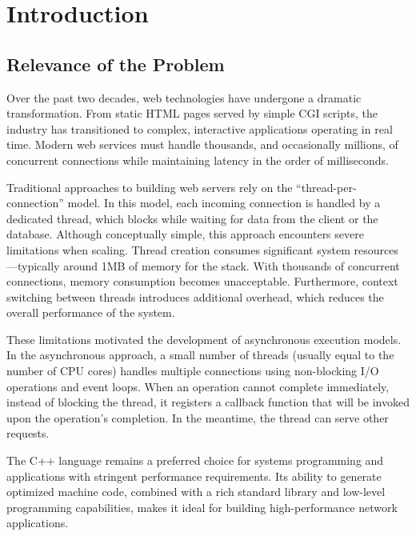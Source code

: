\section{Introduction}

\subsection{Relevance of the Problem}

Over the past two decades, web technologies have undergone a dramatic transformation. From static HTML pages served by simple CGI scripts, the industry has transitioned to complex, interactive applications operating in real time. Modern web services must handle thousands, and occasionally millions, of concurrent connections while maintaining latency in the order of milliseconds.

Traditional approaches to building web servers rely on the ``thread-per-connection'' model. In this model, each incoming connection is handled by a dedicated thread, which blocks while waiting for data from the client or the database. Although conceptually simple, this approach encounters severe limitations when scaling. Thread creation consumes significant system resources---typically around 1MB of memory for the stack. With thousands of concurrent connections, memory consumption becomes unacceptable. Furthermore, context switching between threads introduces additional overhead, which reduces the overall performance of the system.

These limitations motivated the development of asynchronous execution models. In the asynchronous approach, a small number of threads (usually equal to the number of CPU cores) handles multiple connections using non-blocking I/O operations and event loops. When an operation cannot complete immediately, instead of blocking the thread, it registers a callback function that will be invoked upon the operation's completion. In the meantime, the thread can serve other requests.

The C++ language remains a preferred choice for systems programming and applications with stringent performance requirements. Its ability to generate optimized machine code, combined with a rich standard library and low-level programming capabilities, makes it ideal for building high-performance network applications.


